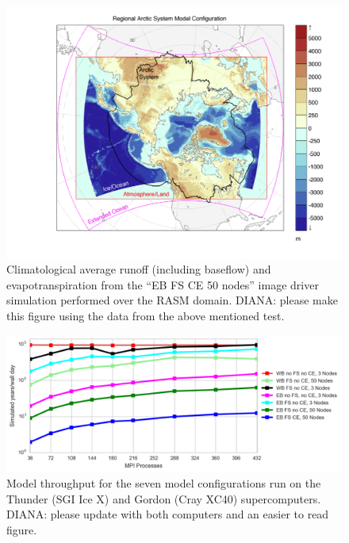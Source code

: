 \documentclass[gmd, manuscript]{copernicus}
\begin{document}
%
%
\clearpage
\begin{figure}[t]
\includegraphics[width=6in]{RASM_Domain.png}
\caption{Climatological average runoff (including baseflow) and evapotranspiration from the ``EB FS CE 50 nodes'' image driver simulation performed over the RASM domain. DIANA: please make this figure using the data from the above mentioned test.}
\label{fig:vic_domain}
\end{figure}

\clearpage
\begin{figure}[t]
\includegraphics[width=6in]{VIC_scaling.png}
\caption{Model throughput for the seven model configurations run on the Thunder (SGI Ice X) and Gordon (Cray XC40) supercomputers. DIANA: please update with both computers and an easier to read figure.}
\label{fig:vic_scaling}
\end{figure}
\end{document}
